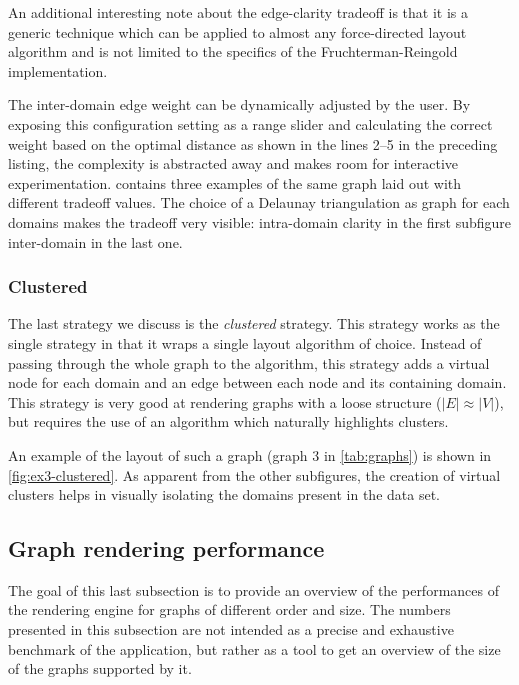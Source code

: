 An additional interesting note about the edge-clarity tradeoff is that it is a generic technique which can be applied to almost any force-directed layout algorithm and is not limited to the specifics of the Fruchterman-Reingold implementation.

The inter-domain edge weight can be dynamically adjusted by the user. By exposing this configuration setting as a range slider and calculating the correct weight based on the optimal distance as shown in the lines 2--5 in the preceding listing, the complexity is abstracted away and makes room for interactive experimentation.  contains three examples of the same graph laid out with different tradeoff values. The choice of a Delaunay triangulation as graph for each domains makes the tradeoff very visible: intra-domain clarity in the first subfigure inter-domain in the last one.

\subsubsection{Clustered}

The last strategy we discuss is the \emph{clustered} strategy. This strategy works as the single strategy in that it wraps a single layout algorithm of choice. Instead of passing through the whole graph to the algorithm, this strategy adds a virtual node for each domain and an edge between each node and its containing domain. This strategy is very good at rendering graphs with a loose structure ($|E| \approx |V|$), but requires the use of an algorithm which naturally highlights clusters.

An example of the layout of such a graph (graph 3 in \ref{tab:graphs}) is shown in \vref{fig:ex3-clustered}. As apparent from the other subfigures, the creation of virtual clusters helps in visually isolating the domains present in the data set.

\subsection{Graph rendering performance}

The goal of this last subsection is to provide an overview of the performances of the rendering engine for graphs of different order and size. The numbers presented in this subsection are not intended as a precise and exhaustive benchmark of the application, but rather as a tool to get an overview of the size of the graphs supported by it.

